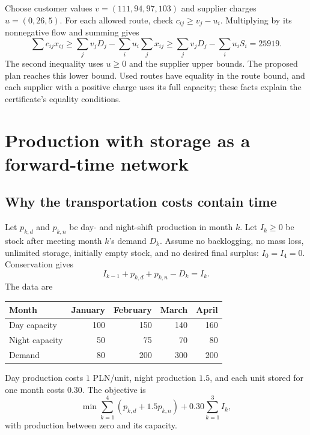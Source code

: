 \documentclass[11pt,a4paper]{article}
\begin{document}
Choose customer values $v=(111,94,97,103)$ and supplier charges $u=(0,26,5)$.
For each allowed route, check $c_{ij}\geq v_j-u_i$. Multiplying by its
nonnegative flow and summing gives
\[
  \sum c_{ij}x_{ij}\geq\sum_j v_jD_j-\sum_i u_i\sum_jx_{ij}
  \geq\sum_jv_jD_j-\sum_i u_iS_i=25919.
\]
The second inequality uses $u\geq0$ and the supplier upper bounds. The proposed
plan reaches this lower bound. Used routes have equality in the route bound,
and each supplier with a positive charge uses its full capacity; these facts
explain the certificate's equality conditions.

\section{Production with storage as a forward-time network}\label{sec:storage}
\subsection{Why the transportation costs contain time}
Let $p_{k,d}$ and $p_{k,n}$ be day- and night-shift production in month $k$.
Let $I_k\geq0$ be stock after meeting month $k$'s demand $D_k$. Assume no
backlogging, no mass loss, unlimited storage, initially empty stock, and no
desired final surplus: $I_0=I_4=0$. Conservation gives
\begin{equation}\label{eq:inventory}
  I_{k-1}+p_{k,d}+p_{k,n}-D_k=I_k.
\end{equation}
The data are
\begin{center}
  \begin{tabular}{lrrrr}\toprule
    Month & January & February & March & April\\\midrule
    Day capacity & 100 & 150 & 140 & 160\\
    Night capacity & 50 & 75 & 70 & 80\\
    Demand & 80 & 200 & 300 & 200\\\bottomrule
  \end{tabular}
\end{center}
Day production costs $1$ PLN/unit, night production $1.5$, and each unit stored
for one month costs $0.30$. The objective is
\[
  \min\sum_{k=1}^4(p_{k,d}+1.5p_{k,n})+0.30\sum_{k=1}^3 I_k,
\]
with production between zero and its capacity.
\end{document}
